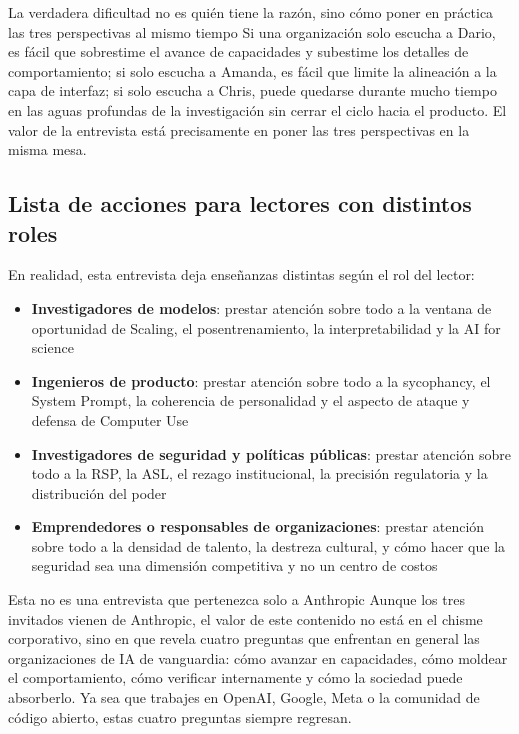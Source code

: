 \begin{knowledgebox}{La verdadera dificultad no es quién tiene la razón, sino cómo poner en práctica las tres perspectivas al mismo tiempo}
Si una organización solo escucha a Dario, es fácil que sobrestime el avance de capacidades y subestime los detalles de comportamiento; si solo escucha a Amanda, es fácil que limite la alineación a la capa de interfaz; si solo escucha a Chris, puede quedarse durante mucho tiempo en las aguas profundas de la investigación sin cerrar el ciclo hacia el producto. El valor de la entrevista está precisamente en poner las tres perspectivas en la misma mesa.
\end{knowledgebox}

\subsection{Lista de acciones para lectores con distintos roles}

En realidad, esta entrevista deja enseñanzas distintas según el rol del lector:

\begin{itemize}
    \item \textbf{Investigadores de modelos}: prestar atención sobre todo a la ventana de oportunidad de Scaling, el posentrenamiento, la interpretabilidad y la AI for science
    \item \textbf{Ingenieros de producto}: prestar atención sobre todo a la sycophancy, el System Prompt, la coherencia de personalidad y el aspecto de ataque y defensa de Computer Use
    \item \textbf{Investigadores de seguridad y políticas públicas}: prestar atención sobre todo a la RSP, la ASL, el rezago institucional, la precisión regulatoria y la distribución del poder
    \item \textbf{Emprendedores o responsables de organizaciones}: prestar atención sobre todo a la densidad de talento, la destreza cultural, y cómo hacer que la seguridad sea una dimensión competitiva y no un centro de costos
\end{itemize}

\begin{importantbox}{Esta no es una entrevista que pertenezca solo a Anthropic}
Aunque los tres invitados vienen de Anthropic, el valor de este contenido no está en el chisme corporativo, sino en que revela cuatro preguntas que enfrentan en general las organizaciones de IA de vanguardia: cómo avanzar en capacidades, cómo moldear el comportamiento, cómo verificar internamente y cómo la sociedad puede absorberlo. Ya sea que trabajes en OpenAI, Google, Meta o la comunidad de código abierto, estas cuatro preguntas siempre regresan.
\end{importantbox}

